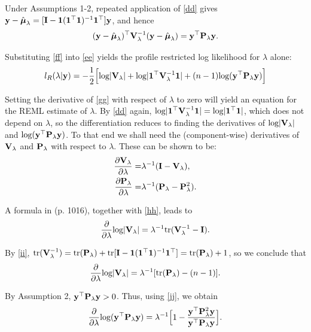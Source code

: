 \documentclass[article]{jss}
\begin{document}
\begin{appendix}
Under Assumptions 1-2, repeated application of \eqref{dd} gives ${\bf y}-\hat{\boldsymbol{\mu}}_\lambda=[{\bf I}-\mathbf{1}(\mathbf{1}^\top \mathbf{1})^{-1}\mathbf{1}^\top ]{\bf y}$, and hence
\begin{align}
({\bf y}-\hat{\boldsymbol{\mu}}_\lambda)^\top {\bf V}_\lambda^{-1}({\bf y}-\hat{\boldsymbol{\mu}}_\lambda)={\bf y}^\top {\bf P}_\lambda {\bf y}.\label{ff}
\end{align}

Substituting \eqref{ff} into \eqref{ee} yields the profile restricted log likelihood for $\lambda$ alone:
\begin{align}
l_R(\lambda|{\bf y})=-\frac{1}{2}\Big[\mbox{log}| {\bf V}_\lambda | +\mbox{log} | \mathbf{1}^\top {\bf V}_\lambda^{-1}\mathbf{1} |+(n-1)\mbox{log}({\bf y}^\top {\bf P}_\lambda {\bf y})\Big] \label{gg}
\end{align}

Setting the derivative of \eqref{gg} with respect of $\lambda$ to zero will yield an equation for the REML estimate of $\lambda$. By \eqref{dd} again, $\mbox{log} | \mathbf{1}^\top {\bf V}_\lambda^{-1}\mathbf{1} |=\mbox{log} | \mathbf{1}^\top \mathbf{1} |$, which does not depend on $\lambda$, so the differentiation reduces to finding the derivatives of $\mbox{log}| {\bf V}_\lambda |$ and $\mbox{log}({\bf y}^\top {\bf P}_\lambda {\bf y})$. To that end we shall need the (component-wise) derivatives of ${\bf V}_\lambda$ and ${\bf P}_\lambda$ with respect to $\lambda$. These can be shown to be:
\begin{align}
\frac{\partial {\bf V}_\lambda}{\partial \lambda}=&\lambda^{-1}({\bf I}-{\bf V}_\lambda), \label{hh} \\
\frac{\partial {\bf P}_\lambda}{\partial \lambda}=&\lambda^{-1}({\bf P}_\lambda-{\bf P}_\lambda^2). \label{jj}
\end{align}

A formula in \citep{lindstrom_newtonraphson_1988}(p. 1016), together with \eqref{hh}, leads to
\begin{align*}
\frac{\partial}{\partial \lambda}\mbox{log}| {\bf V}_\lambda |=\lambda^{-1}\mbox{tr}({\bf V}_\lambda^{-1}-{\bf I}).
\end{align*}

By \eqref{ii}, $\mbox{tr}({\bf V}_\lambda^{-1})=\mbox{tr}({\bf P}_\lambda)+\mbox{tr}[{\bf I}-\mathbf{1}(\mathbf{1}^\top \mathbf{1})^{-1}\mathbf{1}^\top ]=\mbox{tr}({\bf P}_\lambda)+1$, so we conclude that
\begin{align}
\frac{\partial}{\partial \lambda}\mbox{log}| {\bf V}_\lambda |=\lambda^{-1}[\mbox{tr}({\bf P}_\lambda)-(n-1)]. \label{kk}
\end{align}

By Assumption 2, ${\bf y}^\top {\bf P}_\lambda {\bf y}>0$. Thus, using \eqref{jj}, we obtain
\begin{align}
\frac{\partial}{\partial \lambda}\mbox{log}({\bf y}^\top {\bf P}_\lambda {\bf y})=\lambda^{-1}\Big[1-\frac{{\bf y}^\top {\bf P}_\lambda^2{\bf y}}{{\bf y}^\top {\bf P}_\lambda {\bf y}} \Big]. \label{ll}
\end{align}


\end{appendix}
\end{document}
